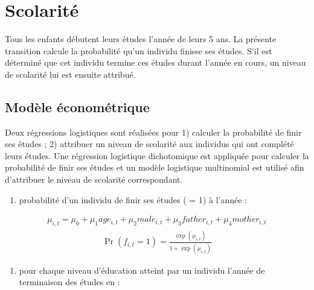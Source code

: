 \documentclass[letterpaper,10pt,french]{sphinxmanual}
\begin{document}
\section{Scolarité}
\label{\detokenize{methodologie:scolarite}}
Tous les enfants débutent leurs études l’année de leurs 5 ans.
La présente transition calcule la probabilité qu’un individu finisse ses études.
S’il est déterminé que cet individu termine ces études durant l’année en cours, un niveau de scolarité lui est ensuite attribué.


\subsection{Modèle économétrique}
\label{\detokenize{methodologie:model2}}\label{\detokenize{methodologie:id1}}
Deux régressions logistiques sont réalisées pour 1) calculer la probabilité de finir ses études ; 2) attribuer un niveau de scolarité aux individus qui ont complété leurs études.
Une régression logistique dichotomique est appliquée pour calculer la probabilité de finir ses études et un modèle logistique multinomial est utilisé afin d’attribuer le niveau de scolarité correspondant.
\begin{enumerate}
%
\item {} 
probabilité d’un individu  de finir ses études ( = 1) à l’année  :

\end{enumerate}
\begin{equation*}
\begin{split}\mu_{i,t} = \mu_{0} + \mu_{1} age_{i,t} + \mu_{2} male_{i,t} + \mu_{3} father_{i,t} + \mu_{4} mother_{i,t}\end{split}
\end{equation*}\begin{equation*}
\begin{split}\Pr(f_{i,t}=1) = \frac{\exp(\mu_{i,t})}{1+\exp(\mu_{i,t})}\end{split}
\end{equation*}\begin{enumerate}
%
\setcounter{enumi}{1}
\item {} 
pour chaque niveau d’éducation  atteint par un individu  l’année de terminaison des études en  :

\end{enumerate}
\end{document}
